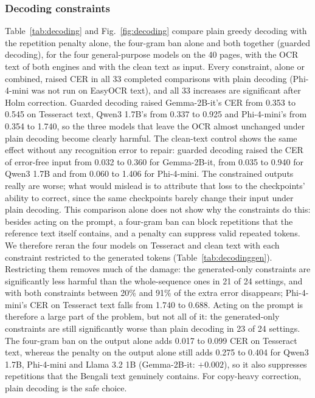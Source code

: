 \documentclass[conference]{IEEEtran}
\begin{document}
\subsubsection{Decoding constraints}
\label{sec:decoding}
Table~\ref{tab:decoding} and Fig.~\ref{fig:decoding} compare plain greedy decoding with the repetition penalty alone, the four-gram ban alone and both together (guarded decoding), for the four general-purpose models on the 40 pages, with the OCR text of both engines and with the clean text as input. Every constraint, alone or combined, raised CER in all 33 completed comparisons with plain decoding (Phi-4-mini was not run on EasyOCR text), and all 33 increases are significant after Holm correction. Guarded decoding raised Gemma-2B-it's CER from 0.353 to 0.545 on Tesseract text, Qwen3 1.7B's from 0.337 to 0.925 and Phi-4-mini's from 0.354 to 1.740, so the three models that leave the OCR almost unchanged under plain decoding become clearly harmful. The clean-text control shows the same effect without any recognition error to repair: guarded decoding raised the CER of error-free input from 0.032 to 0.360 for Gemma-2B-it, from 0.035 to 0.940 for Qwen3 1.7B and from 0.060 to 1.406 for Phi-4-mini. The constrained outputs really are worse; what would mislead is to attribute that loss to the checkpoints' ability to correct, since the same checkpoints barely change their input under plain decoding. This comparison alone does not show why the constraints do this: besides acting on the prompt, a four-gram ban can block repetitions that the reference text itself contains, and a penalty can suppress valid repeated tokens. We therefore reran the four models on Tesseract and clean text with each constraint restricted to the generated tokens (Table~\ref{tab:decodinggen}). Restricting them removes much of the damage: the generated-only constraints are significantly less harmful than the whole-sequence ones in 21 of 24 settings, and with both constraints between 20\% and 91\% of the extra error disappears; Phi-4-mini's CER on Tesseract text falls from 1.740 to 0.688. Acting on the prompt is therefore a large part of the problem, but not all of it: the generated-only constraints are still significantly worse than plain decoding in 23 of 24 settings. The four-gram ban on the output alone adds 0.017 to 0.099 CER on Tesseract text, whereas the penalty on the output alone still adds 0.275 to 0.404 for Qwen3 1.7B, Phi-4-mini and Llama 3.2 1B (Gemma-2B-it: $+0.002$), so it also suppresses repetitions that the Bengali text genuinely contains. For copy-heavy correction, plain decoding is the safe choice.
\end{document}
